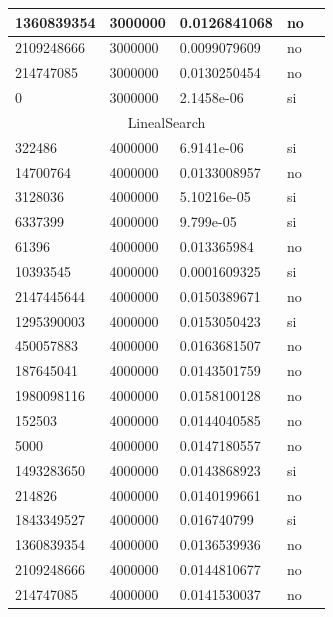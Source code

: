 \documentclass[12pt, fleqn]{article}                             %
\theoremstyle{break}                                            %
\begin{document}
\begin{longtable}{|m{5em}|m{5em}|m{10em}|m{5em}|@{}m{0pt}@{}}
            1360839354& 3000000  & 0.0126841068 & no &\\[1em]    \hline
            2109248666& 3000000  & 0.0099079609 & no &\\[1em]    \hline
            214747085& 3000000  & 0.0130250454 & no &\\[1em]    \hline
            0& 3000000  & 2.1458e-06 & si &\\[1em]    \hline
            \multicolumn{5}{|c|}{LinealSearch}   \\          \hline
            322486& 4000000  & 6.9141e-06 & si &\\[1em]    \hline
            14700764& 4000000  & 0.0133008957 & no &\\[1em]    \hline
            3128036& 4000000  & 5.10216e-05 & si &\\[1em]    \hline
            6337399& 4000000  & 9.799e-05 & si &\\[1em]    \hline
            61396& 4000000  & 0.013365984 & no &\\[1em]    \hline
            10393545& 4000000  & 0.0001609325 & si &\\[1em]    \hline
            2147445644& 4000000  & 0.0150389671 & no &\\[1em]    \hline
            1295390003& 4000000  & 0.0153050423 & si &\\[1em]    \hline
            450057883& 4000000  & 0.0163681507 & no &\\[1em]    \hline
            187645041& 4000000  & 0.0143501759 & no &\\[1em]    \hline
            1980098116& 4000000  & 0.0158100128 & no &\\[1em]    \hline
            152503& 4000000  & 0.0144040585 & no &\\[1em]    \hline
            5000& 4000000  & 0.0147180557 & no &\\[1em]    \hline
            1493283650& 4000000  & 0.0143868923 & si &\\[1em]    \hline
            214826& 4000000  & 0.0140199661 & no &\\[1em]    \hline
            1843349527& 4000000  & 0.016740799 & si &\\[1em]    \hline
            1360839354& 4000000  & 0.0136539936 & no &\\[1em]    \hline
            2109248666& 4000000  & 0.0144810677 & no &\\[1em]    \hline
            214747085& 4000000  & 0.0141530037 & no &\\[1em]    \hline

\end{longtable}
\end{document}

